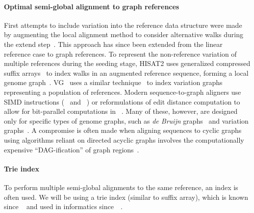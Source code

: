 \paragraph{Optimal semi-global alignment to graph references}
First attempts to include variation into the reference data structure were made
by augmenting the local alignment method to consider alternative walks during
the extend step~\cite{schneeberger_simultaneous_2009,palmapper}. This approach
has since been extended from the linear reference case to graph references. To
represent the non-reference variation of multiple references during the seeding
stage, HISAT2 uses generalized compressed suffix
arrays~\cite{siren_indexing_2014} to index walks in an augmented reference
sequence, forming a local genome graph~\cite{kim_graphbased_2019}.
VG~\cite{garrison_variation_2018} uses a similar
technique~\cite{siren_indexing_2017} to index variation graphs representing a
population of references. Modern sequence-to-graph aligners use SIMD
instructions (\vg~\cite{garrison_variation_2018} and
\pasgal~\cite{jain_accelerating_2019}) or reformulations of edit distance
computation to allow for bit-parallel computations in
\graphaligner~\cite{rautiainen_bitparallel_2019}. Many of these, however, are
designed only for specific types of genome graphs, such as {\itshape de Bruijn}
graphs~\cite{liu_debga_2016,limasset2019toward} and variation
graphs~\cite{garrison_variation_2018}. A compromise is often made when aligning
sequences to cyclic graphs using algorithms reliant on directed acyclic graphs
involves the computationally expensive ``DAG-ification'' of graph
regions~\cite{kavya_sequence_2019,garrison_variation_2018}.

\paragraph{Trie index}
To perform multiple semi-global alignments to the same reference, an index is
often used. We will be using a trie index (similar to suffix array), which is
known since \citeyear{thue1912gegenseitige}~\cite{thue1912gegenseitige} and used
in informatics since~\citeyear{de1959file}~\cite{de1959file}.